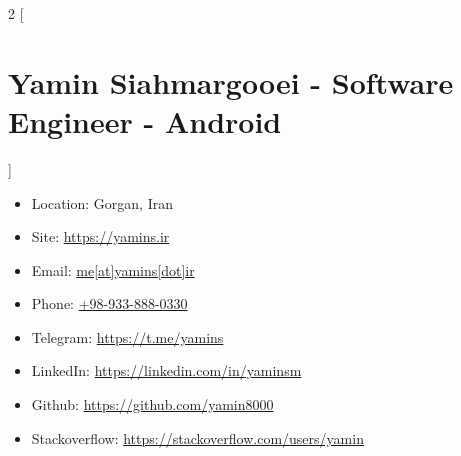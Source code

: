 \begin{multicols}{2}
[\section*{\LARGE{Yamin Siahmargooei - Software Engineer - Android}}]
    \begin{itemize}
        \item Location: Gorgan, Iran
        \item Site: \href{https://yamins.ir}{https://yamins.ir}
        \item Email: \href{mailto:me@yamins.ir}{me[at]yamins[dot]ir}
        \item Phone: \href{tel:0989338880330}{+98-933-888-0330}
        \item Telegram: \href{https://t.me/yamins}{https://t.me/yamins}
        \item LinkedIn: \href{https://linkedin.com/in/yaminsm}{https://linkedin.com/in/yaminsm}
        \item Github: \href{https://github.com/yamin8000}{https://github.com/yamin8000}
        \item Stackoverflow: \href{https://stackoverflow.com/users/yamin}{https://stackoverflow.com/users/yamin}
    \end{itemize}
\end{multicols}